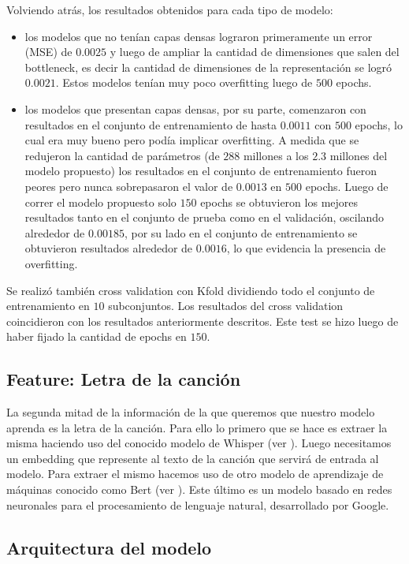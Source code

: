 \documentclass[colorinlistoftodos,twoside,twocolumn,10pt]{article} %
\begin{document}
Volviendo atrás, los resultados obtenidos para cada tipo de modelo:
\begin{itemize}
	\item los modelos que no tenían capas densas lograron primeramente un error (MSE) de $0.0025$ y luego de ampliar la   cantidad de dimensiones que salen del bottleneck, es decir la cantidad de dimensiones de la representación se logró $0.0021$. Estos modelos tenían muy poco overfitting luego de $500$ epochs.
	\item los modelos que presentan capas densas, por su parte, comenzaron con resultados en el conjunto de entrenamiento de hasta $0.0011$ con $500$ epochs, lo cual era muy bueno pero podía implicar overfitting. A medida que se redujeron la cantidad de parámetros (de $288$ millones a los $2.3$ millones del modelo propuesto) los resultados en el conjunto de entrenamiento fueron peores pero nunca sobrepasaron el valor de $0.0013$ en $500$ epochs. Luego de correr el modelo propuesto solo $150$ epochs se obtuvieron los mejores resultados tanto en el conjunto de prueba como en el validación, oscilando alrededor de $0.00185$, por su lado en el conjunto de entrenamiento se obtuvieron resultados alrededor de $0.0016$, lo que evidencia la presencia de overfitting.
\end{itemize}

Se realizó también cross validation con Kfold dividiendo todo el conjunto de entrenamiento en $10$ subconjuntos. Los resultados del cross validation coincidieron con los resultados anteriormente descritos. Este test se hizo luego de haber fijado la cantidad de epochs en $150$.

\subsection{Feature: Letra de la canci\'on}

La segunda mitad de la informaci\'on de la que queremos que nuestro modelo aprenda es la letra de la canci\'on. Para ello lo primero que se hace es extraer la misma haciendo uso del conocido modelo de Whisper (ver \cite{whisper}). Luego necesitamos un embedding que represente al texto de la canci\'on que servir\'a de entrada al modelo. Para extraer el mismo hacemos uso de otro modelo de aprendizaje de m\'aquinas conocido como Bert (ver \cite{bert}). Este \'ultimo es un modelo basado en redes neuronales para el procesamiento de lenguaje natural, desarrollado por Google.

\subsection{Arquitectura del modelo}
\end{document}
